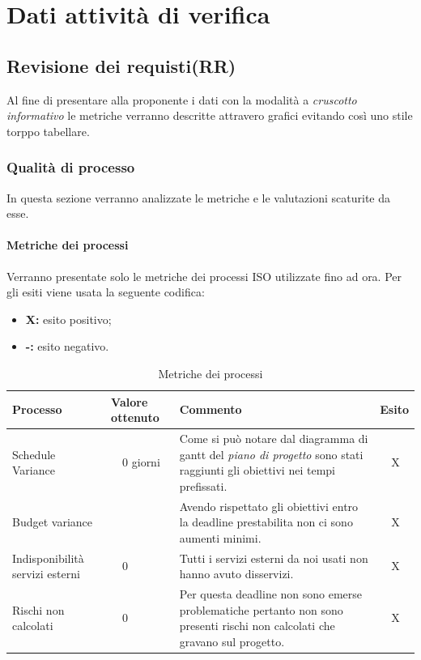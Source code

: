 \section{Dati attività di verifica}
\subsection{Revisione dei requisti(RR)}
Al fine di presentare alla proponente i dati con la modalità a \textit{cruscotto informativo} le metriche verranno descritte attravero grafici evitando così uno stile torppo tabellare.
\subsubsection{Qualità di processo}
In questa sezione verranno analizzate le metriche e le valutazioni scaturite da esse.
\clearpage
\paragraph{Metriche dei processi}
\hspace{10cm} %
\newline Verranno presentate solo le metriche dei processi ISO utilizzate fino ad ora.
Per gli esiti viene usata la seguente codifica:
\begin{itemize}
	\item \textbf{X: } esito positivo;
	\item \textbf{-: } esito negativo.
\end{itemize}
\begin{table}[!htbp]
	\centering
	\renewcommand{\arraystretch}{2} 
	\begin{tabular}{|l|p{2cm}|p{7cm}|l|}
		\rowcolor{orange!50}
		\hline
		\textbf{Processo} & \textbf{Valore ottenuto} & \textbf{Commento} & \textbf{Esito} \\
		\hline
		Schedule Variance & ~~0 giorni & Come si può notare dal diagramma di gantt del \textit{piano di progetto} sono stati raggiunti gli obiettivi nei tempi prefissati. & ~~X \\
		\hline
		Budget variance & ~~\EUR{ -5} & Avendo rispettato gli obiettivi entro la deadline prestabilita non ci sono aumenti minimi. &  ~~X \\
		\hline
		{Indisponibilità servizi esterni} & ~~0 & Tutti i servizi esterni da noi usati non hanno avuto disservizi.  & ~~X\\
		\hline
		Rischi non calcolati & ~~0 & Per questa deadline non sono emerse problematiche pertanto non sono presenti rischi non calcolati che gravano sul progetto. & ~~X\\
		\hline
	\end{tabular}
	\caption{Metriche dei processi}
\end{table}
\clearpage

